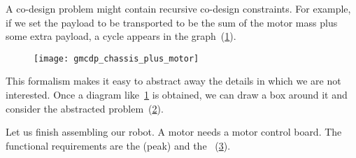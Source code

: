 \begin{example}
    \begin{marginfigure}
        \centering
        \caption{\label{fig:total_cost}}
    \end{marginfigure}



    A co-design problem might contain recursive co-design constraints.
    For example, if we set the payload to be transported to be the sum
    of the motor mass plus some extra payload, a cycle appears in the
    graph~(\cref{fig:gmcdp_chassis_plus_motor}).


    \begin{figure}[h]
        \centering{}\texttt{[image: gmcdp\_chassis\_plus\_motor]}
        \caption{\label{fig:gmcdp_chassis_plus_motor}}
    \end{figure}


    This formalism makes it easy to abstract away the details
    in which we are not interested. Once a diagram like~\cref{fig:gmcdp_chassis_plus_motor}
    is obtained, we can draw a box around it and consider the abstracted
    problem~(\cref{fig:gmcdp_chassis_plus_motor-1}).


    \begin{figure}[h!]
        \begin{center}
            \caption{\label{fig:gmcdp_chassis_plus_motor-1}}
        \end{center}
    \end{figure}


    \label{exa:finish}Let us finish assembling our robot. A motor needs
    a motor control board. The functional requirements are the (peak)
     and the ~(\cref{fig:mcb}).

    \begin{figure}[h]
        \centering
        \caption{\label{fig:mcb}}
    \end{figure}


\end{example}
